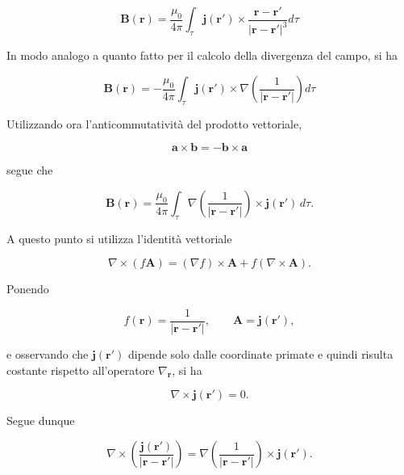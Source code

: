 \begin{equation}
    \mathbf{B}(\mathbf{r}) = \frac{\mu_0}{4 \pi} \int_{\tau} \mathbf{j} (\mathbf{r'}) \times \frac{\mathbf{r} - \mathbf{r'}}{|\mathbf{r} - \mathbf{r'}|^3} d\tau
\end{equation}

In modo analogo a quanto fatto per il calcolo della divergenza del campo, si ha 

\begin{equation*}
    \mathbf{B}(\mathbf{r}) = - \frac{\mu_0}{4 \pi} \int_{\tau} \mathbf{j} (\mathbf{r}') \times \nabla\left( \frac{1}{|\mathbf{r} - \mathbf{r'}|} \right) d\tau
\end{equation*}

Utilizzando ora l'anticommutatività del prodotto vettoriale,

\begin{equation*}
    \mathbf a \times \mathbf b = - \mathbf b \times \mathbf a
\end{equation*}

segue che

\begin{equation*}
    \mathbf{B}(\mathbf{r})
    = \frac{\mu_0}{4 \pi} \int_{\tau}
    \nabla \left( \frac{1}{|\mathbf r - \mathbf r'|} \right)
    \times \mathbf{j}(\mathbf r') \, d\tau.
\end{equation*}

A questo punto si utilizza l'identità vettoriale

\begin{equation}
    \nabla \times (f \mathbf A)
    = (\nabla f) \times \mathbf A + f (\nabla \times \mathbf A).
\end{equation}

Ponendo

\begin{equation*}
f(\mathbf r)=\frac{1}{|\mathbf r - \mathbf r'|}, \qquad \mathbf A=\mathbf j(\mathbf r'),
\end{equation*}

e osservando che $\mathbf j(\mathbf r')$ dipende solo dalle coordinate primate e quindi risulta costante rispetto all'operatore $\nabla_{\mathbf r}$, si ha

\begin{equation*}
    \nabla \times \mathbf j(\mathbf r') = 0.
\end{equation*}

Segue dunque

\begin{equation*}
    \nabla \times \left( \frac{\mathbf j(\mathbf r')}{|\mathbf r - \mathbf r'|} \right)
    =
    \nabla \left( \frac{1}{|\mathbf r - \mathbf r'|} \right)
    \times \mathbf j(\mathbf r').
\end{equation*}

